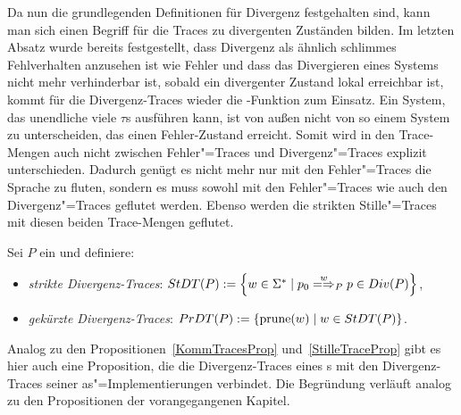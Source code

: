 Da nun die grundlegenden Definitionen für Divergenz festgehalten sind, kann man
sich einen Begriff für die Traces zu divergenten Zuständen bilden. Im letzten
Absatz wurde bereits festgestellt, dass Divergenz als ähnlich \glqq
schlimmes\grqq{} Fehlverhalten anzusehen ist wie Fehler und dass das
Divergieren eines Systems nicht mehr verhinderbar ist, sobald ein divergenter
Zustand lokal erreichbar ist, kommt für die Divergenz-Traces wieder die
\prune{}-Funktion zum Einsatz. Ein System, das unendliche viele $\tau$s
ausführen kann, ist von außen nicht von so einem System zu unterscheiden, das
einen Fehler-Zustand erreicht. Somit wird in den Trace-Mengen auch nicht
zwischen Fehler"=Traces und Divergenz"=Traces explizit unterschieden. Dadurch
genügt es nicht mehr nur mit den Fehler"=Traces die Sprache zu fluten, sondern
es muss sowohl mit den Fehler"=Traces wie auch den Divergenz"=Traces geflutet
werden. Ebenso werden die strikten Stille"=Traces mit diesen beiden
Trace-Mengen geflutet.

\begin{Def}
  Sei $P$ ein \MEIO{} und definiere:
  \begin{itemize}
    \item \emph{strikte Divergenz-Traces}: $\StDT (P) := \left\{w\in\Sigma
      ^*\mid p_0\weakmay[w]_P p\in Div(P)\right\}$,
    \item \emph{gekürzte Divergenz-Traces}: $PrDT (P) := \left\{\mathrm{prune} (w)\mid
      w\in StDT (P)\right\}$.
  \end{itemize}
\end{Def}

Analog zu den Propositionen~\ref{KommTracesProp} und~\ref{StilleTraceProp} gibt
es hier auch eine Proposition, die die Divergenz-Traces eines \MEIO{}s mit den
Divergenz-Traces seiner as"=Implementierungen verbindet. Die Begründung
verläuft analog zu den Propositionen der vorangegangenen Kapitel.

